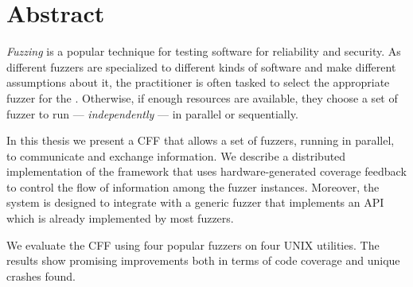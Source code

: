 \begingroup%
\let\clearpage\relax%
\let\cleardoublepage\relax%
\let\cleardoublepage\relax%

\chapter*{Abstract}

\emph{Fuzzing} is a popular technique for testing software for reliability and
security. As different fuzzers are specialized to different kinds of software
and make different assumptions about it, the practitioner is often tasked to
select the appropriate fuzzer for the \sut. Otherwise, if enough resources are
available, they choose a set of fuzzer to run --- \emph{independently} --- in
parallel or sequentially.

In this thesis we present a \ac{CFF} that allows a set of fuzzers, running in
parallel, to communicate and exchange information. We describe a distributed
implementation of the framework that uses hardware-generated coverage feedback
to control the flow of information among the fuzzer instances. Moreover, the
system is designed to integrate with a generic fuzzer that implements an
\acs{API} which is already implemented by most fuzzers.

We evaluate the \ac{CFF} using four popular fuzzers on four UNIX utilities. The
results show promising improvements both in terms of code coverage and unique
crashes found.

\endgroup%

\vfill%

